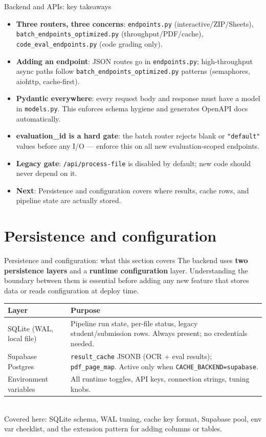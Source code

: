 \documentclass[aspectratio=169]{beamer}
\begin{document}
\begin{frame}{Backend and APIs: key takeaways}
  \small
  \begin{itemize}\setlength\itemsep{0.3em}
    \item \textbf{Three routers, three concerns}: \texttt{endpoints.py} (interactive/ZIP/Sheets), \texttt{batch\_endpoints\_optimized.py} (throughput/PDF/cache), \texttt{code\_eval\_endpoints.py} (code grading only).
    \item \textbf{Adding an endpoint}: JSON routes go in \texttt{endpoints.py}; high-throughput async paths follow \texttt{batch\_endpoints\_optimized.py} patterns (semaphores, aiohttp, cache-first).
    \item \textbf{Pydantic everywhere}: every request body and response must have a model in \texttt{models.py}. This enforces schema hygiene and generates OpenAPI docs automatically.
    \item \textbf{evaluation\_id is a hard gate}: the batch router rejects blank or \texttt{"default"} values before any I/O --- enforce this on all new evaluation-scoped endpoints.
    \item \textbf{Legacy gate}: \texttt{/api/process-file} is disabled by default; new code should never depend on it.
    \item \textbf{Next}: Persistence and configuration covers where results, cache rows, and pipeline state are actually stored.
  \end{itemize}
\end{frame}

\section{Persistence and configuration}

\begin{frame}{Persistence and configuration: what this section covers}
  \small
  The backend uses \textbf{two persistence layers} and a \textbf{runtime configuration} layer.
  Understanding the boundary between them is essential before adding any new feature
  that stores data or reads configuration at deploy time.\\[0.4em]
  \begin{tabular}{@{}p{4.5cm}p{9.2cm}@{}}
    \toprule
    Layer & Purpose \\
    \midrule
    SQLite (WAL, local file) & Pipeline run state, per-file status, legacy student/submission rows. Always present; no credentials needed. \\
    Supabase Postgres & \texttt{result\_cache} JSONB (OCR + eval results); \texttt{pdf\_page\_map}. Active only when \texttt{CACHE\_BACKEND=supabase}. \\
    Environment variables & All runtime toggles, API keys, connection strings, tuning knobs. \\
    \bottomrule
  \end{tabular}
  \vspace{0.3em}\\
  \footnotesize Covered here: SQLite schema, WAL tuning, cache key format, Supabase pool, env var checklist, and the extension pattern for adding columns or tables.
\end{frame}
\end{document}
